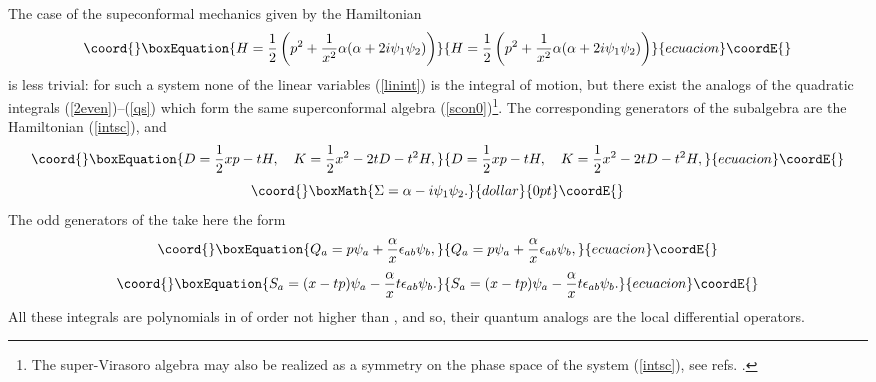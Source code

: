 \documentclass[a4paper,12pt]{article}
\begin{document}
The case of the supeconformal mechanics
given by the Hamiltonian
\begin{equation}\coord{}\boxEquation{
H=\frac{1}{2}\left(p^2+\frac{1}{x^2}
\alpha(\alpha+2i\psi_1\psi_2)\right)
\label{intsc}
}{
H=\frac{1}{2}\left(p^2+\frac{1}{x^2}
\alpha(\alpha+2i\psi_1\psi_2)\right)
}{ecuacion}\coordE{}\end{equation}
is less trivial: for such a system
none of the linear variables (\ref{linint})
is the integral of motion,
but there exist the analogs of the
quadratic integrals (\ref{2even})--(\ref{qs})
which form the same
superconformal algebra (\ref{scon0})\footnote{The
super-Virasoro
algebra may also be realized as a symmetry on the phase
space of the system (\ref{intsc}), see refs.
\cite{Kum,Marc}.}.
The corresponding generators of the
subalgebra \coordHE{}
are the Hamiltonian (\ref{intsc}), and
\begin{equation}\coord{}\boxEquation{
D=
\frac{1}{2}xp-tH,\quad
K=
\frac{1}{2}x^2-2tD-t^2H,
\label{tdk}
}{
D=
\frac{1}{2}xp-tH,\quad
K=
\frac{1}{2}x^2-2tD-t^2H,
}{ecuacion}\coordE{}\end{equation}
$$\coord{}\boxMath{
\Sigma=\alpha-i\psi_1\psi_2.
}{dollar}{0pt}\coordE{}$$
The odd generators of the \coordHE{}
take here the form
\begin{equation}\coord{}\boxEquation{
Q_a=p\psi_a+\frac{\alpha}{x}\epsilon_{ab}\psi_b,
\label{q1}
}{
Q_a=p\psi_a+\frac{\alpha}{x}\epsilon_{ab}\psi_b,
}{ecuacion}\coordE{}\end{equation}
\begin{equation}\coord{}\boxEquation{
S_a=(x-tp)\psi_a -\frac{\alpha}{x}t\epsilon_{ab}\psi_b.
\label{s1}
}{
S_a=(x-tp)\psi_a -\frac{\alpha}{x}t\epsilon_{ab}\psi_b.
}{ecuacion}\coordE{}\end{equation}
All these integrals are polynomials in \coordHE{}
of order not higher than \coordHE{},
and so, their quantum analogs are the local
differential operators.
\end{document}
